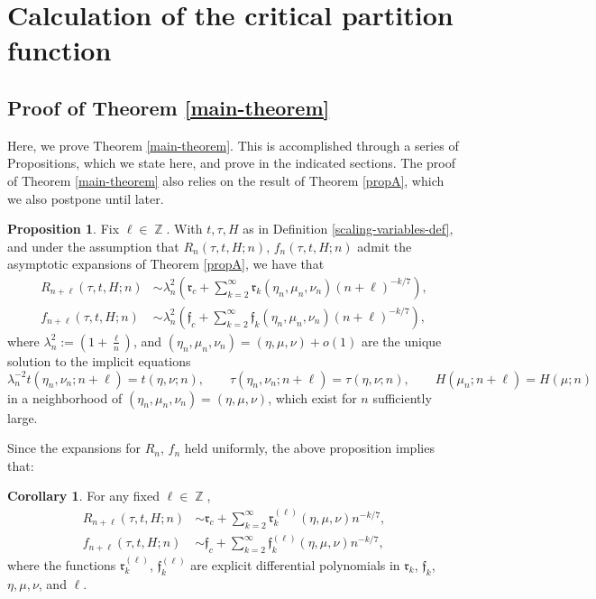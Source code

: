 \documentclass[usenames,dvipsnames]{article}
\theoremstyle{definition}
\newtheorem{prop}{Proposition}[section]
\newtheorem{cor}{Corollary}[section]
\DeclareMathOperator{\ZZ}{\mathbb{Z}}
\numberwithin{equation}{section}
\numberwithin{figure}{section}
\begin{document}
\section{Calculation of the critical partition function}\label{section:CPF}
\subsection{Proof of Theorem \ref{main-theorem}}
Here, we prove Theorem \ref{main-theorem}. This is accomplished through a series of Propositions, which we state here, and prove in the indicated sections. The proof of Theorem \ref{main-theorem} also relies on the result of Theorem \ref{propA}, which we also postpone until later.

\begin{prop}\label{propB}
    Fix $\ell\in \ZZ$. With $t,\tau,H$ as in Definition \ref{scaling-variables-def}, and under the assumption that 
    $R_n(\tau,t,H;n)$, $f_n(\tau,t,H;n)$ admit the asymptotic expansions of Theorem \ref{propA}, we have that
        \begin{align}
            R_{n+\ell}(\tau,t,H;n) &\sim \lambda_n^2\left(\mathfrak{r}_c + \sum_{k=2}^{\infty} \mathfrak{r}_k(\eta_n,\mu_n,\nu_n)(n+\ell)^{-k/7}\right),\label{R-nl}\\
            f_{n+\ell}(\tau,t,H;n) &\sim \lambda_n^2\left(\mathfrak{f}_c + \sum_{k=2}^{\infty} \mathfrak{f}_k(\eta_n,\mu_n,\nu_n)(n+\ell)^{-k/7}\right),\label{f-nl}
        \end{align}
    where $\lambda_n^2 :=\left(1+\frac{\ell}{n}\right)$, and $(\eta_n,\mu_n,\nu_n) = (\eta,\mu,\nu) + o(1)$ are the unique solution to the implicit equations
        \begin{equation}
            \lambda_n^{-2}t(\eta_n,\nu_n;n+\ell)=t(\eta,\nu;n),\qquad \tau(\eta_n,\nu_n;n+\ell)=\tau(\eta,\nu;n), \qquad H(\mu_n;n+\ell)=H(\mu;n)
        \end{equation}
    in a neighborhood of $(\eta_n,\mu_n,\nu_n) = (\eta,\mu,\nu)$, which exist for $n$ sufficiently large.
\end{prop}
Since the expansions for $R_n$, $f_n$ held uniformly, the above proposition implies that:
\begin{cor} For any fixed $\ell\in \ZZ$,
    \begin{align*}
        R_{n+\ell}(\tau,t,H;n) &\sim \mathfrak{r}_c + \sum_{k=2}^{\infty} \mathfrak{r}_k^{(\ell)}(\eta,\mu,\nu) n^{-k/7},\\
        f_{n+\ell}(\tau,t,H;n) &\sim \mathfrak{f}_c + \sum_{k=2}^{\infty} \mathfrak{f}_k^{(\ell)}(\eta,\mu,\nu) n^{-k/7},
    \end{align*}
where the functions $\mathfrak{r}_k^{(\ell)}$, $\mathfrak{f}_k^{(\ell)}$ are explicit differential polynomials in $\mathfrak{r}_k$, $\mathfrak{f}_k$, $\eta,\mu,\nu$, and $\ell$.
\end{cor}
\end{document}
